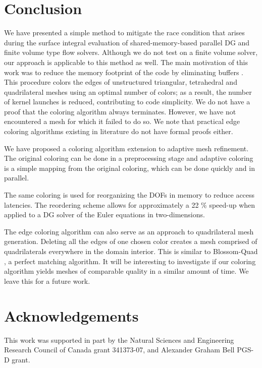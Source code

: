 \documentclass[12pt]{article}
\begin{document}
	
	\section{Conclusion}
We have presented a simple method to mitigate the race condition that arises during the surface integral evaluation of shared-memory-based parallel DG and finite volume type flow solvers.  Although we do not test on a finite volume solver, our approach is applicable to this method as well.  The main motivation of this work was to reduce the memory footprint of the code by eliminating buffers \cite{giuliani, nodaldg, corrigan}.  This procedure colors the edges of unstructured triangular, tetrahedral and quadrilateral meshes using an optimal number of colors; as a result, the number of kernel launches is reduced, contributing to code simplicity.  We do not have a proof that the coloring algorithm always terminates.  However, we have not encountered a mesh for which it failed to do so.  We note that practical edge coloring algorithms existing in literature \cite{complexcolors, fiol2012} do not have formal proofs either.

We have proposed a coloring algorithm extension to adaptive mesh refinement.  The original coloring can be done in a preprocessing stage and adaptive coloring is a simple mapping from the original coloring, which can be done quickly and in parallel.  

The same coloring is used for reorganizing the DOFs in memory to reduce access latencies.  The reordering scheme allows for approximately a 22 \% speed-up when applied to a DG solver of the Euler equations in two-dimensions.  

The edge coloring algorithm can also serve as an approach to quadrilateral mesh generation.  Deleting all the edges of one chosen color creates a mesh comprised of quadrilaterals everywhere in the domain interior.  This is similar to Blossom-Quad \cite{quadblossom}, a perfect matching algorithm.   It will be interesting to investigate if our coloring algorithm yields meshes of comparable quality in a similar amount of time.  We leave this for a future work.
	
	
\section{Acknowledgements}
This work was supported in part by the Natural Sciences and Engineering Research Council of Canada grant 341373-07, and Alexander Graham Bell PGS-D grant. 
	
	
	{}
	
\end{document}
